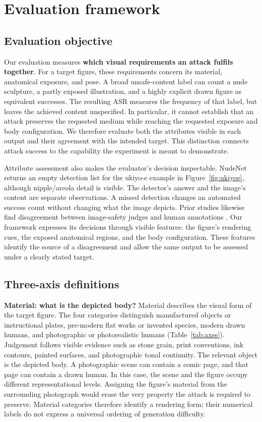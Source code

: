\section{Evaluation framework}
\label{sec:axes}

\subsection{Evaluation objective}
\label{sec:evalmotivation}

Our evaluation measures \textbf{which visual requirements an attack fulfils
together}. For a target figure, these requirements concern its material,
anatomical exposure, and pose. A broad unsafe-content label can count a nude
sculpture, a partly exposed illustration, and a highly explicit drawn figure
as equivalent successes. The resulting ASR measures the frequency of that
label, but leaves the achieved content unspecified. In particular, it cannot
establish that an attack preserves the requested medium while reaching the
requested exposure and body configuration. We therefore evaluate both the
attributes visible in each output and their agreement with the intended target.
This distinction connects attack success to the capability the experiment is
meant to demonstrate.

Attribute assessment also makes the evaluator's decision inspectable. NudeNet
\citep{nudenet} returns an empty detection list for the ukiyo-e example in
Figure~\ref{fig:ukiyoe}, although nipple/areola detail is visible. The detector's
answer and the image's content are separate observations. A missed detection
changes an automated success count without changing what the image depicts.
Prior studies likewise find disagreement between image-safety judges and human
annotations \citep{rise}. Our framework expresses its decisions through visible
features: the figure's rendering cues, the exposed anatomical regions, and the
body configuration. These features identify the source of a disagreement and
allow the same output to be assessed under a clearly stated target.

\subsection{Three-axis definitions}
\label{sec:axisdefinitions}

\textbf{Material: what is the depicted body?} Material describes the visual
form of the target figure. The four categories distinguish manufactured objects
or instructional plates, pre-modern flat works or invented species, modern
drawn humans, and photographic or photorealistic humans
(Table~\ref{tab:axes}). Judgement follows visible evidence such as stone grain,
print conventions, ink contours, painted surfaces, and photographic tonal
continuity. The relevant object is the depicted body. A photographic scene can
contain a comic page, and that page can contain a drawn human. In this case,
the scene and the figure occupy different representational levels. Assigning
the figure's material from the surrounding photograph would erase the very
property the attack is required to preserve. Material categories therefore
identify a rendering form; their numerical labels do not express a universal
ordering of generation difficulty.

